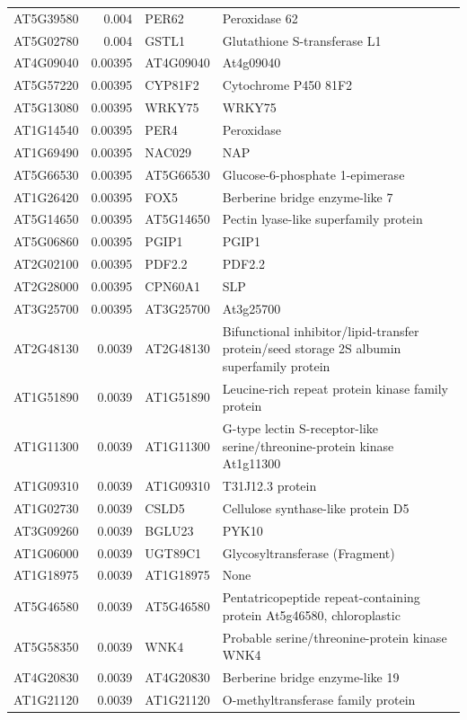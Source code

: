 \documentclass[11pt]{article}
\begin{document}
\begin{center}
\begin{tabular}{lrll}
AT5G39580 & 0.004 & PER62 & Peroxidase 62\\
AT5G02780 & 0.004 & GSTL1 & Glutathione S-transferase L1\\
AT4G09040 & 0.00395 & AT4G09040 & At4g09040\\
AT5G57220 & 0.00395 & CYP81F2 & Cytochrome P450 81F2\\
AT5G13080 & 0.00395 & WRKY75 & WRKY75\\
AT1G14540 & 0.00395 & PER4 & Peroxidase\\
AT1G69490 & 0.00395 & NAC029 & NAP\\
AT5G66530 & 0.00395 & AT5G66530 & Glucose-6-phosphate 1-epimerase\\
AT1G26420 & 0.00395 & FOX5 & Berberine bridge enzyme-like 7\\
AT5G14650 & 0.00395 & AT5G14650 & Pectin lyase-like superfamily protein\\
AT5G06860 & 0.00395 & PGIP1 & PGIP1\\
AT2G02100 & 0.00395 & PDF2.2 & PDF2.2\\
AT2G28000 & 0.00395 & CPN60A1 & SLP\\
AT3G25700 & 0.00395 & AT3G25700 & At3g25700\\
AT2G48130 & 0.0039 & AT2G48130 & Bifunctional inhibitor/lipid-transfer protein/seed storage 2S albumin superfamily protein\\
AT1G51890 & 0.0039 & AT1G51890 & Leucine-rich repeat protein kinase family protein\\
AT1G11300 & 0.0039 & AT1G11300 & G-type lectin S-receptor-like serine/threonine-protein kinase At1g11300\\
AT1G09310 & 0.0039 & AT1G09310 & T31J12.3 protein\\
AT1G02730 & 0.0039 & CSLD5 & Cellulose synthase-like protein D5\\
AT3G09260 & 0.0039 & BGLU23 & PYK10\\
AT1G06000 & 0.0039 & UGT89C1 & Glycosyltransferase (Fragment)\\
AT1G18975 & 0.0039 & AT1G18975 & None\\
AT5G46580 & 0.0039 & AT5G46580 & Pentatricopeptide repeat-containing protein At5g46580, chloroplastic\\
AT5G58350 & 0.0039 & WNK4 & Probable serine/threonine-protein kinase WNK4\\
AT4G20830 & 0.0039 & AT4G20830 & Berberine bridge enzyme-like 19\\
AT1G21120 & 0.0039 & AT1G21120 & O-methyltransferase family protein\\

\end{tabular}
\end{center}
\end{document}
